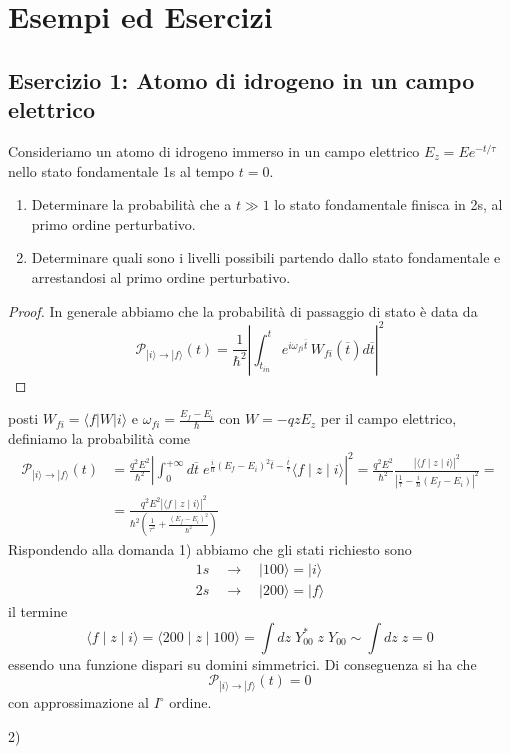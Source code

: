 \newpage

\section{Esempi ed Esercizi}

\subsection{Esercizio 1: Atomo di idrogeno in un campo elettrico}

Consideriamo un atomo di idrogeno immerso in un campo elettrico $E_z = E e^{-t/\tau}$ nello stato fondamentale 1s al tempo $t=0$.
\begin{enumerate}
	\item Determinare la probabilit\`a che a $t \gg 1$ lo stato fondamentale finisca in 2s, al primo ordine perturbativo.
	\item Determinare quali sono i livelli possibili partendo dallo stato fondamentale e arrestandosi al primo ordine perturbativo.
\end{enumerate}

\begin{proof}
	In generale abbiamo che la probabilit\`a di passaggio di stato \`e data da
	\begin{equation*}
		\mathcal{P}_{|i\rangle \to |f \rangle}(t)  = \frac{1}{\hbar^2} \left| \int_{t_{in}}^{t}e^{i\omega_{fi}\overline{t}}\,W_{fi}(\overline{t})d\overline{t}\right|^2   
	\end{equation*}
\end{proof}
posti $W_{fi} =\langle f | W|i\rangle$ e $\omega_{fi} = \frac{E_{f}-E_{i}}{\hbar}$ con $W = -qzE_z$ per il campo elettrico, definiamo la probabilit\`a come 
\begin{align*}
	\mathcal{P}_{|i\rangle \to |f \rangle}(t) &= \frac{q^2E^2}{\hbar^2} \left | \int_{0}^{+\infty} d\overline{t} \; e^{\frac{i}{\hbar}(E_f-E_i)^2 \overline{t}-\frac{\overline{t}}{\tau}}\langle f \mid z\mid i \rangle \right|^2 = \frac{q^2E^2}{\hbar^2}\frac{|\langle f \mid z\mid i \rangle|^2}{|\frac{1}{\tau} - \frac{i}{\hbar}(E_f-E_i)|^2} = \\[0.5cm]
	& =  \frac{q^2E^2|\langle f \mid z\mid i \rangle|^2}{\hbar^2(\frac{1}{\tau^2} + \frac{(E_f-E_i)^2}{\hbar^2})}
\end{align*}
Rispondendo alla domanda 1) abbiamo che gli stati richiesto sono
\begin{align*}
	1s \quad \to \quad |100\rangle = |i\rangle \\[0.3cm]
	2s \quad \to \quad |200\rangle = |f \rangle 
\end{align*}
il termine 
\begin{equation*}
	\langle f \mid z \mid i\rangle = \langle 200  \mid z \mid 100 \rangle = \int dz \; Y_{00} ^*\;z\;Y_{00} \sim \int dz\; z = 0
\end{equation*}
essendo una funzione dispari su domini simmetrici. Di conseguenza si ha che 
\begin{equation*}
	\mathcal{P}_{|i\rangle \to |f \rangle}(t) = 0
\end{equation*}
con approssimazione al $I^\circ $ ordine.
\newline

2) 